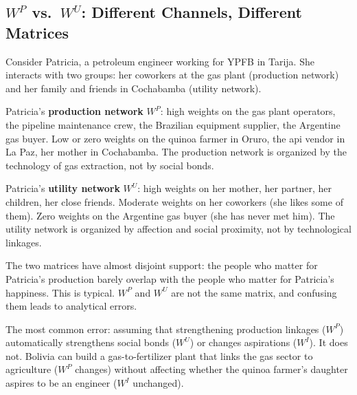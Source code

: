 \documentclass[../structural_economics_book.tex]{subfiles}
\begin{document}
\subsection{$W^P$ vs.\ $W^U$: Different Channels, Different Matrices}

\begin{example}\label{ch05:ex:gas_engineer}
Consider Patricia, a petroleum engineer working for YPFB in Tarija. She interacts with two groups: her coworkers at the gas plant (production network) and her family and friends in Cochabamba (utility network).

Patricia's \textbf{production network} $W^P$: high weights on the gas plant operators, the pipeline maintenance crew, the Brazilian equipment supplier, the Argentine gas buyer. Low or zero weights on the quinoa farmer in Oruro, the api vendor in La Paz, her mother in Cochabamba. The production network is organized by the technology of gas extraction, not by social bonds.

Patricia's \textbf{utility network} $W^U$: high weights on her mother, her partner, her children, her close friends. Moderate weights on her coworkers (she likes some of them). Zero weights on the Argentine gas buyer (she has never met him). The utility network is organized by affection and social proximity, not by technological linkages.

The two matrices have almost disjoint support: the people who matter for Patricia's production barely overlap with the people who matter for Patricia's happiness. This is typical. $W^P$ and $W^U$ are not the same matrix, and confusing them leads to analytical errors.

The most common error: assuming that strengthening production linkages ($W^P$) automatically strengthens social bonds ($W^U$) or changes aspirations ($W^I$). It does not. Bolivia can build a gas-to-fertilizer plant that links the gas sector to agriculture ($W^P$ changes) without affecting whether the quinoa farmer's daughter aspires to be an engineer ($W^I$ unchanged).
\end{example}
\end{document}
